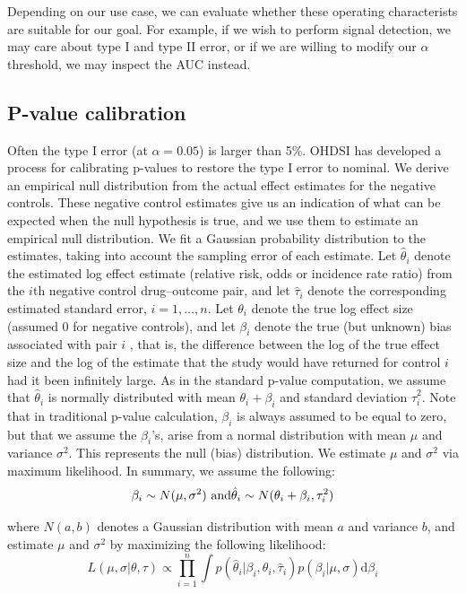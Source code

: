 \documentclass[11pt]{book}
\begin{document}
Depending on our use case, we can evaluate whether these operating
characterists are suitable for our goal. For example, if we wish to
perform signal detection, we may care about type I and type II error, or
if we are willing to modify our \(\alpha\) threshold, we may inspect the
AUC instead.

\subsection{P-value calibration}\label{p-value-calibration}

Often the type I error (at \(\alpha = 0.05\)) is larger than 5\%. OHDSI
has developed a process for calibrating p-values to restore the type I
error to nominal. \citep{schuemie_2014} We derive an empirical null
distribution from the actual effect estimates for the negative controls.
These negative control estimates give us an indication of what can be
expected when the null hypothesis is true, and we use them to estimate
an empirical null distribution. We fit a Gaussian probability
distribution to the estimates, taking into account the sampling error of
each estimate. Let \(\hat{\theta}_i\) denote the estimated log effect
estimate (relative risk, odds or incidence rate ratio) from the \(i\)th
negative control drug--outcome pair, and let \(\hat{\tau}_i\) denote the
corresponding estimated standard error, \(i=1,\ldots,n\). Let
\(\theta_i\) denote the true log effect size (assumed 0 for negative
controls), and let \(\beta_i\) denote the true (but unknown) bias
associated with pair \(i\) , that is, the difference between the log of
the true effect size and the log of the estimate that the study would
have returned for control \(i\) had it been infinitely large. As in the
standard p-value computation, we assume that \(\hat{\theta}_i\) is
normally distributed with mean \(\theta_i + \beta_i\) and standard
deviation \(\hat{\tau}_i^2\). Note that in traditional p-value
calculation, \(\beta_i\) is always assumed to be equal to zero, but that
we assume the \(\beta_i\)'s, arise from a normal distribution with mean
\(\mu\) and variance \(\sigma^2\). This represents the null (bias)
distribution. We estimate \(\mu\) and \(\sigma^2\) via maximum
likelihood. In summary, we assume the following:
\[\beta_i \sim N(\mu,\sigma^2) \text{  and} \\ \hat{\theta}_i \sim N(\theta_i + \beta_i, \tau_i^2)\]

where \(N(a,b)\) denotes a Gaussian distribution with mean \(a\) and
variance \(b\), and estimate \(\mu\) and \(\sigma^2\) by maximizing the
following likelihood:
\[L(\mu, \sigma | \theta, \tau) \propto \prod_{i=1}^{n}\int p(\hat{\theta}_i|\beta_i, \theta_i, \hat{\tau}_i)p(\beta_i|\mu, \sigma) \text{d}\beta_i\]
\end{document}
